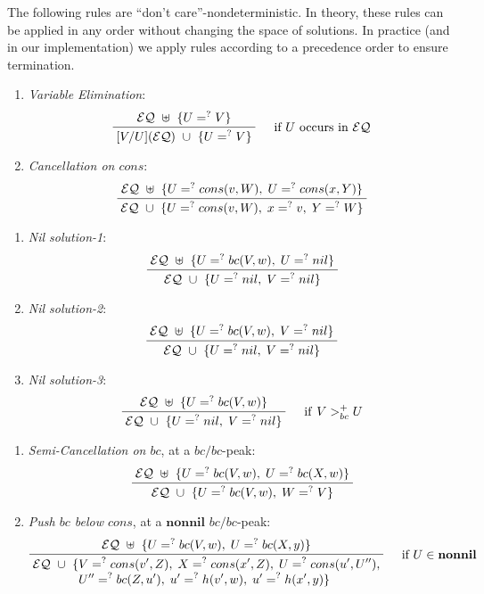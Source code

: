 \documentclass[11pt,twoside,titlepage]{article}
\newcommand{\ueq}{=_{}^?}
\newcommand{\EQ}{\mathcal{EQ}}
\newcommand{\Bc}{\mathit{bc}}
\newcommand{\Cons}{\mathit{cons}}
\newcommand{\Nonnil}{\mathbf{nonnil}}
\begin{document}
The following rules are ``don't care''-nondeterministic. In theory, these rules
can be applied in any order without changing the space of solutions. In practice
(and in our implementation) we apply rules according to a precedence order to
ensure termination.
\begin{enumerate}[(L1), align=left, font=\bfseries]
    \item \emph{Variable Elimination}:
        \[\infer[\quad \text{if } U \text{ occurs in } \EQ ]
            {\; [V/U](\EQ) ~ \cup ~ \{U \ueq V\} \;}
            {\; \EQ ~ \uplus ~ \{U \ueq V\} \;}
        \]

    \item \emph{Cancellation on $\Cons$}:
        \[\infer
            {\; \EQ ~ \cup ~ \{ U \ueq cons(v, W), \; x \ueq v, \; Y \ueq W \} \;}
            {\; \EQ ~ \uplus ~ \{ U \ueq cons(v, W), \; U \ueq cons(x, Y) \} \;}
        \]
\end{enumerate}
\begin{enumerate}[(L3.a), align=left, font=\bfseries]
    \item \emph{Nil solution-1}:
        \[\infer
            {\; \EQ ~ \cup ~ \{ U \ueq nil, \; V \ueq nil \} \;}
            {\; \EQ ~ \uplus ~ \{ U \ueq bc(V, w), \; U \ueq nil \} \;}
        \]

    \item \emph{Nil solution-2}:
        \[\infer
            {\; \EQ ~ \cup ~ \{ U \ueq nil, \; V \ueq nil \} \;}
            {\; \EQ ~ \uplus ~ \{ U \ueq bc(V, w), \; V \ueq nil \} \;}
        \]

    \item \emph{Nil solution-3}:
        \[\infer[\quad \mathrm{if} ~ V >_{bc}^{+} U ]
            {\; \EQ ~ \cup ~ \{ U \ueq nil, \; V \ueq nil \} \;}
            {\; \EQ ~ \uplus ~ \{ U \ueq bc(V, w) \} \;}
        \]
\end{enumerate}
\begin{enumerate}[(L4.a), align=left, font=\bfseries]
    \item \emph{Semi-Cancellation on $\Bc$}, at a $\Bc/\Bc$-peak:
        \[\infer
            {\; \EQ ~ \cup ~ \{U \ueq bc(V, w), \; W \ueq V \} \;}
            {\; \EQ ~ \uplus ~ \{ U \ueq bc(V, w), \; U \ueq bc(X, w) \} \;}
        \]

    \item \emph{Push $\Bc$ below $\Cons$}, at a $\Nonnil$ $\Bc/\Bc$-peak:
        \[\infer[\quad \text{if } U \in \Nonnil]
            {\; \begin{aligned}
                \EQ ~ \cup ~ \{
                & V \ueq cons(v', Z), \; X \ueq cons(x', Z), \;
                  U \ueq cons(u', U''), \\[-4pt]
                & U'' \ueq bc(Z, u'), \; u' \ueq h(v', w), \;
                  u' \ueq h(x', y) \}
            \end{aligned} \;}
            {\; \EQ ~ \uplus ~ \{ U \ueq bc(V, w), \; U \ueq bc(X, y) \} \;}
        \]
\end{enumerate}
\end{document}
